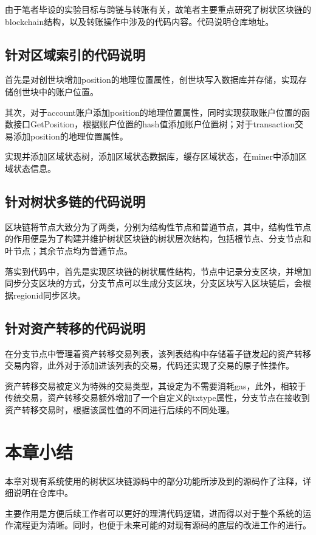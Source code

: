 由于笔者毕设的实验目标与跨链与转账有关，故笔者主要重点研究了树状区块链的blockchain结构，以及转账操作中涉及的代码内容。代码说明仓库地址。

\subsection{针对区域索引的代码说明}

首先是对创世块增加position的地理位置属性，创世块写入数据库并存储，实现存储创世块中的账户位置。

其次，对于account账户添加position的地理位置属性，同时实现获取账户位置的函数接口GetPosition，根据账户位置的hash值添加账户位置树；对于transaction交易添加position的地理位置属性。

实现并添加区域状态树，添加区域状态数据库，缓存区域状态，在miner中添加区域状态信息。

\subsection{针对树状多链的代码说明}

区块链将节点大致分为了两类，分别为结构性节点和普通节点，其中，结构性节点的作用便是为了构建并维护树状区块链的树状层次结构，包括根节点、分支节点和叶节点；其余节点均为普通节点。

落实到代码中，首先是实现区块链的树状属性结构，节点中记录分支区块，并增加同步分支区块的方式，分支节点可以生成分支区块，分支区块写入区块链后，会根据regionid同步区块。

\subsection{针对资产转移的代码说明}

在分支节点中管理着资产转移交易列表，该列表结构中存储着子链发起的资产转移交易内容，此外对于添加进该列表的交易，代码还实现了交易的原子性操作。

资产转移交易被定义为特殊的交易类型，其设定为不需要消耗gas，此外，相较于传统交易，资产转移交易额外增加了一个自定义的txtype属性，分支节点在接收到资产转移交易时，根据该属性值的不同进行后续的不同处理。

\section{本章小结}

本章对现有系统使用的树状区块链源码中的部分功能所涉及到的源码作了注释，详细说明在仓库中。

主要作用是方便后续工作者可以更好的理清代码逻辑，进而得以对于整个系统的运作流程更为清晰。同时，也便于未来可能的对现有源码的底层的改进工作的进行。
